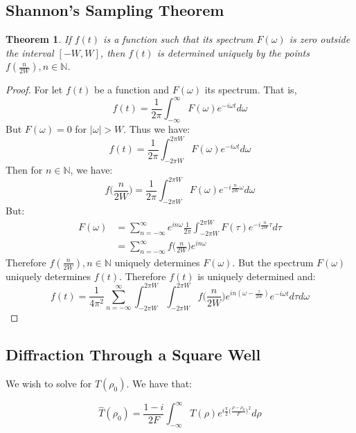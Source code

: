 \documentclass{article}
\theoremstyle{mystyle}
\newtheorem{theorem}{Theorem}[section]
\begin{document}
\subsection{Shannon's Sampling Theorem}
\begin{theorem}
If $f(t)$ is a function such that its spectrum $F(\omega)$ is zero outside the interval $[-W,W]$, then $f(t)$ is determined uniquely by the points $f(\frac{n}{2W}), n\in \mathbb{N}$.
\end{theorem}
\begin{proof}
For let $f(t)$ be a function and $F(\omega)$ its spectrum. That is,
\begin{equation}
f(t) = \frac{1}{2\pi}\int_{-\infty}^{\infty} F(\omega)e^{-i\omega t}d\omega
\end{equation}
But $F(\omega) = 0$ for $|\omega| > W$. Thus we have:
\begin{equation}
f(t) = \frac{1}{2\pi}\int_{-2\pi W}^{2\pi W}F(\omega)e^{-i\omega t}d\omega
\end{equation}
Then for $n\in \mathbb{N}$, we have:
\begin{equation}
f\big(\frac{n}{2W}\big) = \frac{1}{2\pi}\int_{-2\pi W}^{2\pi W}F(\omega) e^{-i\frac{n}{2W}\omega}d\omega
\end{equation}
But:
\begin{align}
F(\omega) &= \sum_{n=-\infty}^{\infty}e^{in\omega}\frac{1}{2\pi}\int_{-2\pi W}^{2\pi W}F(\tau)e^{-i\frac{n}{2W}\tau}d\tau\\
&= \sum_{n=-\infty}^{\infty}f\big(\frac{n}{2W}\big)e^{in\omega}
\end{align}
Therefore $f(\frac{n}{2W}), n\in \mathbb{N}$ uniquely determines $F(\omega)$. But the spectrum $F(\omega)$ uniquely determines $f(t)$. Therefore $f(t)$ is uniquely determined and:
\begin{equation}
f(t) = \frac{1}{4\pi^2}\sum_{n=-\infty}^{\infty}\int_{-2\pi W}^{2\pi W}\int_{-2\pi W}^{2\pi W}f\big(\frac{n}{2W}\big)e^{in(\omega-\frac{\tau}{2W})}e^{-i\omega t}d\tau d\omega
\end{equation}

\end{proof}


\subsection{Diffraction Through a Square Well}

We wish to solve for $\hat{T}(\rho_{0})$. We have that:

\begin{equation}
\hat{T}(\rho_0) = \frac{1-i}{2F}\int_{-\infty}^{\infty}T(\rho)e^{i\frac{\pi}{2}\big(\frac{\rho-\rho_0}{F}\big)^2}d\rho
\end{equation}
\end{document}

